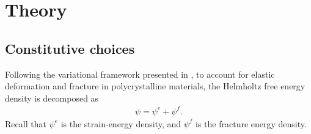 \section{Theory}
\label{section: brittle/theory}

\subsection{Constitutive choices}

Following the variational framework presented in , to account for elastic deformation and fracture in polycrystalline materials, the Helmholtz free energy density is decomposed as
\begin{align}
  \psi = \psi^e + \psi^f. \label{eq: chapter 3 helmholtz}
\end{align}
Recall that $\psi^e$ is the strain-energy density, and $\psi^f$ is the fracture energy density.

